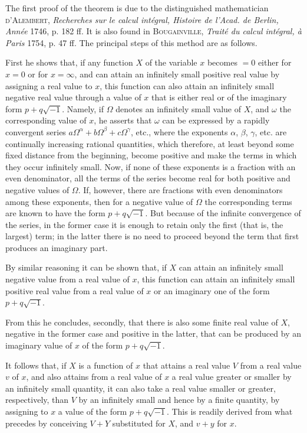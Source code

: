 The first proof of the theorem is due to the distinguished mathematician \textsc{d'Alembert}, \textit{Recherches sur le calcul intégral, Histoire de l'Acad. de Berlin, Année} 1746, p. 182 ff. It is also found in \textsc{Bougainville}, \textit{Traité du calcul intégral, à Paris} 1754, p. 47 ff. The principal steps of this method are as follows.

First he shows that, if any function $X$ of the variable $x$ becomes $=0$ either for $x=0$ or for $x=\infty$, and can attain an infinitely small positive real value by assigning a real value to $x$, this function can also attain an infinitely small negative real value through a value of $x$ that is either real or of the imaginary form $p+q\sqrt{-1}$. Namely, if $\Omega$ denotes an infinitely small value of $X$, and $\omega$ the corresponding value of $x$, he asserts that $\omega$ can be expressed by a rapidly convergent series $a\Omega^\alpha+b\Omega^\beta+c\Omega^\gamma$, etc., where the exponents $\alpha$, $\beta$, $\gamma$, etc. are continually increasing rational quantities, which therefore, at least beyond some fixed distance from the beginning, become positive and make the terms in which they occur infinitely small. Now, if none of these exponents is a fraction with an even denominator, all the terms of the series become real for both positive and negative values of $\Omega$. If, however, there are fractions with even denominators among these exponents, then for a negative value of $\Omega$ the corresponding terms are known to have the form $p+q\sqrt{-1}$. But because of the infinite convergence of the series, in the former case it is enough to retain only the first (that is, the largest) term; in the latter there is no need to proceed beyond the term that first produces an imaginary part.

By similar reasoning it can be shown that, if $X$ can attain an infinitely small negative value from a real value of $x$, this function can attain an infinitely small positive real value from a real value of $x$ or an imaginary one of the form $p+q\sqrt{-1}$.

From this he concludes, secondly, that there is also some finite real value of $X$, negative in the former case and positive in the latter, that can be produced by an imaginary value of $x$ of the form $p+q\sqrt{-1}$.

It follows that, if $X$ is a function of $x$ that attains a real value $V$ from a real value $v$ of $x$, and also attains from a real value of $x$ a real value greater or smaller by an infinitely small quantity, it can also take a real value smaller or greater, respectively, than $V$ by an infinitely small and hence by a finite quantity, by assigning to $x$ a value of the form $p+q\sqrt{-1}$. This is readily derived from what precedes by conceiving $V+Y$ substituted for $X$, and $v+y$ for $x$.

